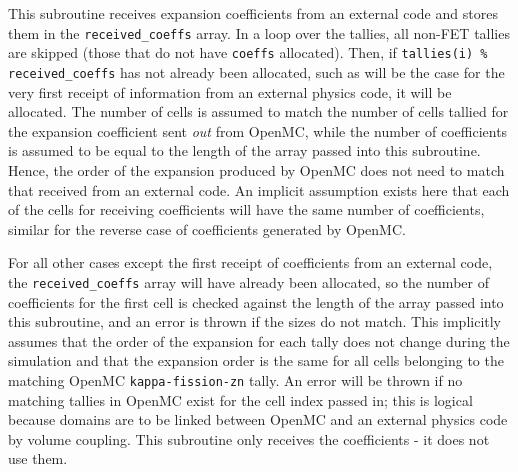 \documentclass[10pt]{article}
\newcommand{\beq}{\begin{equation}}
\newcommand{\eeq}{\end{equation}}
\newcounter{subsubsubsection}[subsubsection]
\numberwithin{equation}{section} %
\begin{document}
This subroutine receives expansion coefficients from an external code and stores them in the {\tt received\_coeffs} array. In a loop over the tallies, all non-FET tallies are skipped (those that do not have {\tt coeffs} allocated). Then, if {\tt tallies(i) \% received\_coeffs} has not already been allocated, such as will be the case for the very first receipt of information from an external physics code, it will be allocated. The number of cells is assumed to match the number of cells tallied for the expansion coefficient sent {\it out} from OpenMC, while the number of coefficients is assumed to be equal to the length of the array passed into this subroutine. Hence, the order of the expansion produced by OpenMC does not need to match that received from an external code. An implicit assumption exists here that each of the cells for receiving coefficients will have the same number of coefficients, similar for the reverse case of coefficients generated by OpenMC. 

For all other cases except the first receipt of coefficients from an external code, the {\tt received\_coeffs} array will have already been allocated, so the number of coefficients for the first cell is checked against the length of the array passed into this subroutine, and an error is thrown if the sizes do not match. This implicitly assumes that the order of the expansion for each tally does not change during the simulation and that the expansion order is the same for all cells belonging to the matching OpenMC {\tt kappa-fission-zn} tally. An error will be thrown if no matching tallies in OpenMC exist for the cell index passed in; this is logical because domains are to be linked between OpenMC and an external physics code by volume coupling. This subroutine only receives the coefficients - it does not use them.

\end{document}

